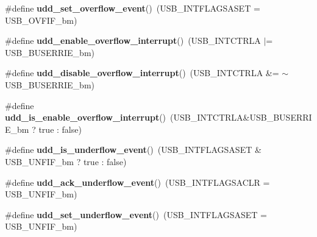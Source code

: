 \begin{DoxyCompactItemize}
\item 
\hypertarget{group__udd__xmega__usb__group_gae6e77b0743a10ffbf8e1c717de4ce299}{\#define {\bfseries udd\-\_\-set\-\_\-overflow\-\_\-event}()~(U\-S\-B\-\_\-\-I\-N\-T\-F\-L\-A\-G\-S\-A\-S\-E\-T = U\-S\-B\-\_\-\-O\-V\-F\-I\-F\-\_\-bm)}\label{group__udd__xmega__usb__group_gae6e77b0743a10ffbf8e1c717de4ce299}

\item 
\hypertarget{group__udd__xmega__usb__group_gaa426bbf9dc907992883875a28395db6a}{\#define {\bfseries udd\-\_\-enable\-\_\-overflow\-\_\-interrupt}()~(U\-S\-B\-\_\-\-I\-N\-T\-C\-T\-R\-L\-A $|$= U\-S\-B\-\_\-\-B\-U\-S\-E\-R\-R\-I\-E\-\_\-bm)}\label{group__udd__xmega__usb__group_gaa426bbf9dc907992883875a28395db6a}

\item 
\hypertarget{group__udd__xmega__usb__group_gaba2c844631624a73489acd7802974d1d}{\#define {\bfseries udd\-\_\-disable\-\_\-overflow\-\_\-interrupt}()~(U\-S\-B\-\_\-\-I\-N\-T\-C\-T\-R\-L\-A \&= $\sim$U\-S\-B\-\_\-\-B\-U\-S\-E\-R\-R\-I\-E\-\_\-bm)}\label{group__udd__xmega__usb__group_gaba2c844631624a73489acd7802974d1d}

\item 
\hypertarget{group__udd__xmega__usb__group_ga5d2d7939b308fc9c9201895c42dbc175}{\#define {\bfseries udd\-\_\-is\-\_\-enable\-\_\-overflow\-\_\-interrupt}()~(U\-S\-B\-\_\-\-I\-N\-T\-C\-T\-R\-L\-A\&U\-S\-B\-\_\-\-B\-U\-S\-E\-R\-R\-I\-E\-\_\-bm ? true \-: false)}\label{group__udd__xmega__usb__group_ga5d2d7939b308fc9c9201895c42dbc175}

\item 
\hypertarget{group__udd__xmega__usb__group_gacc0a3f216212c9777367fd51b3ccc8fc}{\#define {\bfseries udd\-\_\-is\-\_\-underflow\-\_\-event}()~(U\-S\-B\-\_\-\-I\-N\-T\-F\-L\-A\-G\-S\-A\-S\-E\-T \& U\-S\-B\-\_\-\-U\-N\-F\-I\-F\-\_\-bm ? true \-: false)}\label{group__udd__xmega__usb__group_gacc0a3f216212c9777367fd51b3ccc8fc}

\item 
\hypertarget{group__udd__xmega__usb__group_gaf2cb6444cfae9a388b4563292cc50ef4}{\#define {\bfseries udd\-\_\-ack\-\_\-underflow\-\_\-event}()~(U\-S\-B\-\_\-\-I\-N\-T\-F\-L\-A\-G\-S\-A\-C\-L\-R = U\-S\-B\-\_\-\-U\-N\-F\-I\-F\-\_\-bm)}\label{group__udd__xmega__usb__group_gaf2cb6444cfae9a388b4563292cc50ef4}

\item 
\hypertarget{group__udd__xmega__usb__group_gac0b6ba414c3dc39e5554e1a98c05a776}{\#define {\bfseries udd\-\_\-set\-\_\-underflow\-\_\-event}()~(U\-S\-B\-\_\-\-I\-N\-T\-F\-L\-A\-G\-S\-A\-S\-E\-T = U\-S\-B\-\_\-\-U\-N\-F\-I\-F\-\_\-bm)}\label{group__udd__xmega__usb__group_gac0b6ba414c3dc39e5554e1a98c05a776}


\end{DoxyCompactItemize}
